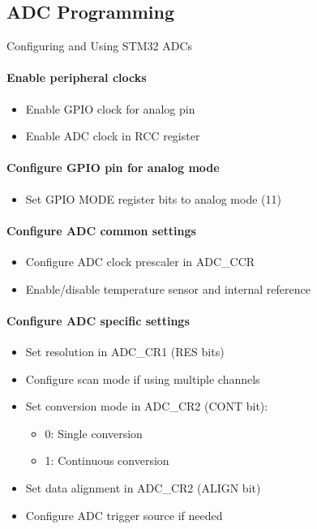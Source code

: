 \subsection{ADC Programming}

\begin{KR}{Configuring and Using STM32 ADCs}\\
\paragraph{Enable peripheral clocks}
\begin{itemize}
    \item Enable GPIO clock for analog pin
    \item Enable ADC clock in RCC register
\end{itemize}

\paragraph{Configure GPIO pin for analog mode}
\begin{itemize}
    \item Set GPIO MODE register bits to analog mode (11)
\end{itemize}

\paragraph{Configure ADC common settings}
\begin{itemize}
    \item Configure ADC clock prescaler in ADC\_CCR
    \item Enable/disable temperature sensor and internal reference
\end{itemize}

\paragraph{Configure ADC specific settings}
\begin{itemize}
    \item Set resolution in ADC\_CR1 (RES bits)
    \item Configure scan mode if using multiple channels
    \item Set conversion mode in ADC\_CR2 (CONT bit):
    \begin{itemize}
        \item 0: Single conversion
        \item 1: Continuous conversion
    \end{itemize}
    \item Set data alignment in ADC\_CR2 (ALIGN bit)
    \item Configure ADC trigger source if needed
\end{itemize}


\end{KR}

